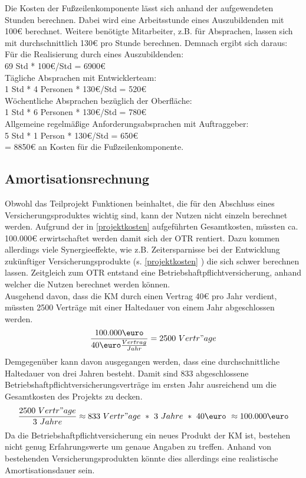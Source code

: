 Die Kosten der Fußzeilenkomponente lässt sich anhand der aufgewendeten Stunden berechnen.
Dabei wird eine Arbeitsstunde eines Auszubildenden mit 100€ berechnet. Weitere benötigte Mitarbeiter, z.B. für Absprachen, lassen sich mit durchschnittlich 130€ pro Stunde berechnen. 
Demnach ergibt sich daraus:\\
Für die Realisierung durch eines Auszubildenden: \\
69 Std * 100€/Std = 6900€ \\
Tägliche Absprachen mit Entwicklerteam: \\
1 Std * 4 Personen * 130€/Std = 520€\\
Wöchentliche Absprachen bezüglich der Oberfläche:  \\
1 Std * 6 Personen * 130€/Std = 780€\\
Allgemeine regelmäßige Anforderungsabsprachen mit Auftraggeber:  \\
5 Std * 1 Person *  130€/Std = 650€\\

= 8850€ an Kosten für die Fußzeilenkomponente.
\subsection{Amortisationsrechnung}
\label{amortisationsdauer}
Obwohl das Teilprojekt Funktionen beinhaltet, die für den Abschluss eines Versicherungsproduktes wichtig sind, kann der Nutzen nicht einzeln berechnet werden. Aufgrund der in \ref{projektkosten}  aufgeführten Gesamtkosten, müssten ca. 100.000€ erwirtschaftet werden damit sich der \ac{OTR} rentiert. Dazu kommen allerdings viele Synergieeffekte, wie z.B. Zeitersparnisse bei der Entwicklung zukünftiger Versicherungsprodukte (s. \ref{projektkosten} ) die sich schwer berechnen lassen. Zeitgleich zum \ac{OTR} entstand eine Betriebshaftpflichtversicherung, anhand welcher die Nutzen berechnet werden können.\\
Ausgehend davon, dass die \ac{KM} durch einen Vertrag 40€ pro Jahr verdient, müssten 2500 Verträge mit einer Haltedauer von einem Jahr abgeschlossen werden.\\
\begin{equation}
	\frac{100.000\mbox{\euro}}{40\mbox{\euro}\frac{Vertrag}{Jahr}} = 2500\ Vertr"age \\
\end{equation}
Demgegenüber kann davon ausgegangen werden, dass eine durchschnittliche Haltedauer von drei Jahren besteht. Damit sind 833 abgeschlossene Betriebshaftpflichtversicherungsverträge im ersten Jahr ausreichend um die Gesamtkosten des Projekts zu decken.
\begin{equation}
	 \frac{2500\ Vertr"age}{3\ Jahre} \approx833\ Vertr"age\ *\ 3\ Jahre\ *\ 40\mbox{\euro}\ \approx100.000\mbox{\euro} \\
\end{equation}
 Da die Betriebshaftpflichtversicherung ein neues Produkt der \ac{KM} ist, bestehen nicht genug Erfahrungswerte um genaue Angaben zu treffen. Anhand von bestehenden Versicherungsprodukten könnte dies allerdings eine realistische Amortisationsdauer sein.

